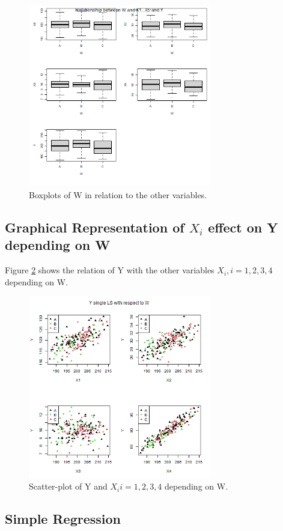 \documentclass[12pt, a4paper]{article}
\begin{document}
	
	\begin{figure}
		\includegraphics[width=8cm]{boxplots_1.png}
		\centering
		\caption{Boxplots of W in relation to the other variables.}
		\label{fig::boxplots_1}
	\end{figure}
	
	
	\subsection{Graphical Representation of $X_i$ effect on Y depending on W}
	
	Figure \ref{fig::scatterplot_1} shows the relation of Y with the other variables $X_i, i=1,2,3,4$ depending on W.
	
	\begin{figure}
		\includegraphics[width=8cm]{scatterplot_1.png}
		\centering
		\caption{Scatter-plot of Y and $X_i i=1,2,3,4$ depending on W.}
		\label{fig::scatterplot_1}
	\end{figure}
	
	
	\subsection{Simple Regression}
	
\end{document}
